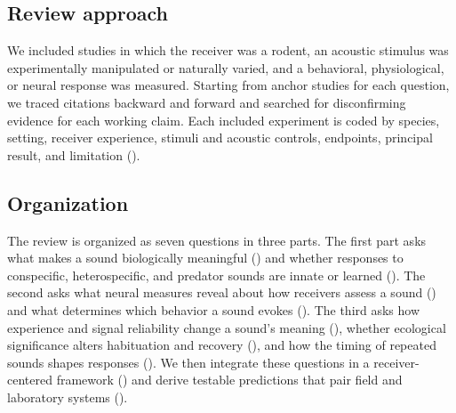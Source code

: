 \subsection{Review approach}
\label{sec:intro-approach}

We included studies in which the receiver was a rodent, an acoustic stimulus was experimentally manipulated or naturally varied, and a behavioral, physiological, or neural response was measured. Starting from anchor studies for each question, we traced citations backward and forward and searched for disconfirming evidence for each working claim. Each included experiment is coded by species, setting, receiver experience, stimuli and acoustic controls, endpoints, principal result, and limitation ().

\subsection{Organization}
\label{sec:intro-organization}

The review is organized as seven questions in three parts. The first part asks what makes a sound biologically meaningful () and whether responses to conspecific, heterospecific, and predator sounds are innate or learned (). The second asks what neural measures reveal about how receivers assess a sound () and what determines which behavior a sound evokes (). The third asks how experience and signal reliability change a sound's meaning (), whether ecological significance alters habituation and recovery (), and how the timing of repeated sounds shapes responses (). We then integrate these questions in a receiver-centered framework () and derive testable predictions that pair field and laboratory systems ().
